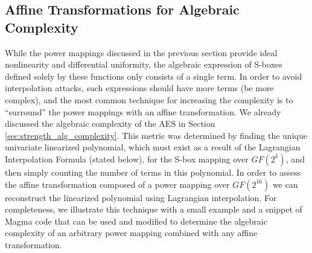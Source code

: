 
\subsection{Affine Transformations for Algebraic Complexity}
While the power mappings discussed in the previous section provide ideal nonlinearity and differential uniformity, the algebraic expression of S-boxes defined solely by these functions only consists of a single term. In order to avoid interpolation attacks, such expressions should have more terms (be more complex), and the most common technique for increasing the complexity is to ``surround'' the power mappings with an affine transformation. We already discussed the algebraic complexity of the AES in Section \ref{sec:strength_alg_complexity}. This metric was determined by finding the unique univariate linearized polynomial, which must exist as a result of the Lagrangian Interpolation Formula (stated below), for the S-box mapping over $GF(2^k)$, and then simply counting the number of terms in this polynomial. In order to assess the affine transformation composed of a power mapping over $GF(2^{16})$ we can reconstruct the linearized polynomial using Lagrangian interpolation. For completeness, we illustrate this technique with a small example and a snippet of Magma code that can be used and modified to determine the algebraic complexity of an arbitrary power mapping combined with any affine transformation.


